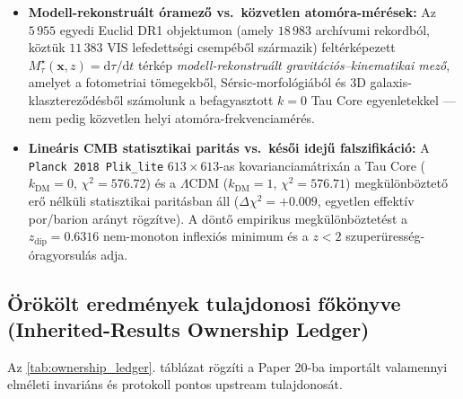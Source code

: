 \documentclass[11pt,a4paper]{article}
\begin{document}
\begin{itemize}
  \item \textbf{Modell-rekonstruált óramező vs.\ közvetlen atomóra-mérések:} Az $5\,955$ egyedi Euclid DR1 objektumon (amely $18\,983$ archívumi rekordból, köztük $11\,383$ VIS lefedettségi csempéből származik) feltérképezett $M_\tau^\star(\mathbf{x}, z) = \mathrm{d}\tau/\mathrm{d}t$ térkép \emph{modell-rekonstruált gravitációs--kinematikai mező}, amelyet a fotometriai tömegekből, Sérsic-morfológiából és 3D galaxis-klasztereződésből számolunk a befagyasztott $k=0$ Tau Core egyenletekkel --- nem pedig közvetlen helyi atomóra-frekvenciamérés.
  \item \textbf{Lineáris CMB statisztikai paritás vs.\ késői idejű falszifikáció:} A \texttt{Planck 2018 Plik\_lite} $613\times 613$-as kovarianciamátrixán a Tau Core ($k_{\mathrm{DM}} = 0$, $\chi^2 = 576.72$) és a $\Lambda\mathrm{CDM}$ ($k_{\mathrm{DM}} = 1$, $\chi^2 = 576.71$) megkülönböztető erő nélküli statisztikai paritásban áll ($\Delta\chi^2 = +0.009$, egyetlen effektív por/barion arányt rögzítve). A döntő empirikus megkülönböztetést a $z_{\mathrm{dip}} = 0.6316$ nem-monoton inflexiós minimum és a $z < 2$ szuperüresség-óragyorsulás adja.
\end{itemize}

\subsection{Örökölt eredmények tulajdonosi főkönyve (Inherited-Results Ownership Ledger)}

Az \ref{tab:ownership_ledger}. táblázat rögzíti a Paper 20-ba importált valamennyi elméleti invariáns és protokoll pontos upstream tulajdonosát.
\end{document}
